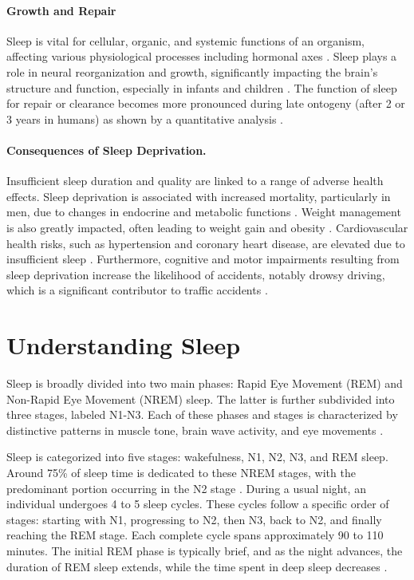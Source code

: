 \documentclass[
  a4paper,  %
  twoside,  %
  bibliography=totoc,
  headsepline,
  cleardoublepage=empty,
  parskip=half,
  draft=false
]{scrbook}
\begin{document}
\paragraph{Growth and Repair}
Sleep is vital for cellular, organic, and systemic functions of an organism, affecting various physiological processes including hormonal axes \cite{dattilo_sleep_2011}. Sleep plays a role in neural reorganization and growth, significantly impacting the brain's structure and function, especially in infants and children \cite{brinkman_physiology_2023}.
The function of sleep for repair or clearance becomes more pronounced during late ontogeny (after 2 or 3 years in humans) as shown by a quantitative analysis \cite{cao_unraveling_2020}.
\paragraph{Consequences of Sleep Deprivation.}
Insufficient sleep duration and quality are linked to a range of adverse health effects. Sleep deprivation is associated with increased mortality, particularly in men, due to changes in endocrine and metabolic functions \cite{yin_relationship_2017}. Weight management is also greatly impacted, often leading to weight gain and obesity \cite{papatriantafyllou_sleep_2022}. Cardiovascular health risks, such as hypertension and coronary heart disease, are elevated due to insufficient sleep \cite{belloir_sleep_2022}. Furthermore, cognitive and motor impairments resulting from sleep deprivation increase the likelihood of accidents, notably drowsy driving, which is a significant contributor to traffic accidents \cite{williamson2011link}.

\section{Understanding Sleep}
Sleep is broadly divided into two main phases: Rapid Eye Movement (REM) and Non-Rapid Eye Movement (NREM) sleep. The latter is further subdivided into three stages, labeled N1-N3. Each of these phases and stages is characterized by distinctive patterns in muscle tone, brain wave activity, and eye movements \cite{patel_physiology_2023}.

Sleep is categorized into five stages: wakefulness, N1, N2, N3, and REM sleep. Around 75\% of sleep time is dedicated to these NREM stages, with the predominant portion occurring in the N2 stage \cite{malik_sleep-wake_2018}. During a usual night, an individual undergoes 4 to 5 sleep cycles. These cycles follow a specific order of stages: starting with N1, progressing to N2, then N3, back to N2, and finally reaching the REM stage. Each complete cycle spans approximately 90 to 110 minutes. The initial REM phase is typically brief, and as the night advances, the duration of REM sleep extends, while the time spent in deep sleep decreases \cite{feinberg_systematic_1979}.
\end{document}
